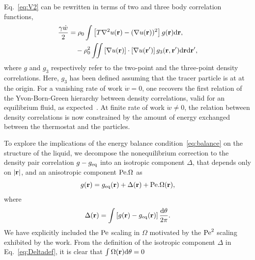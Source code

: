 \documentclass[pre, superscriptaddress, twocolumn,pre]{revtex4-1}
\newcommand{\dd}{\text{d}}
\begin{document}
Eq.~\ref{eq:V2} can be rewritten in terms of two and three body correlation functions, 
\begin{equation}\label{eq:balance}
	\begin{aligned}
		\frac{\gamma \dot w}{2} &= \rho_0 \int \left[T \nabla^2 u({\bf r}) - (\nabla u({\bf r}))^2\right] g({\bf r}) \dd{\bf r} ,
		\\
		&\quad - \rho_0^2 \iint \left[\nabla u({\bf r})\right] \cdot \left[\nabla u({\bf r}')\right] g_3({\bf r}, {\bf r}') \dd{\bf r} \dd{\bf r}' ,
	\end{aligned}
\end{equation}
where $g$ and $g_3$ respectively refer to the two-point and the three-point density correlations. Here, $g_3$ has been defined assuming that the tracer particle is at at the origin. For a vanishing rate of work $\dot w = 0$, one recovers the first relation of the Yvon-Born-Green hierarchy between density correlations, valid for an equilibrium fluid, as expected~\cite{Hansen2013}. At finite rate of work $\dot w\neq0$, the relation between density correlations is now constrained by the amount of energy exchanged between the thermostat and the particles.


To explore the implications of the energy balance condition~\eqref{eq:balance} on the structure of the liquid, we decompose the nonequilibrium correction to the density pair correlation $g-g_{\rm eq}$ into an isotropic component $\Delta$, that depends only on $|{\bf r}|$, and an anisotropic component ${\rm Pe}.\Omega$ as
\begin{equation}\label{eq:g_dec}
	g({\bf r}) = g_{\rm eq}({\bf r}) + \Delta({\bf r}) + {\rm Pe}.\Omega({\bf r}) ,
\end{equation}
where
\begin{equation}\label{eq:Deltadef}
	\Delta({\bf r}) = \int \left[g({\bf r}) - g_{\rm eq}({\bf r}) \right] \frac{\dd\theta}{2\pi} .
\end{equation} 
We have explicitly included the $\rm Pe$ scaling in $\Omega$ motivated by the ${\rm Pe}^2$ scaling exhibited by the work.  From the definition of the isotropic component $\Delta$ in Eq.~\ref{eq:Deltadef}, it is clear that $\int\Omega({\bf r}){\dd\theta}=0$ 
\end{document}
